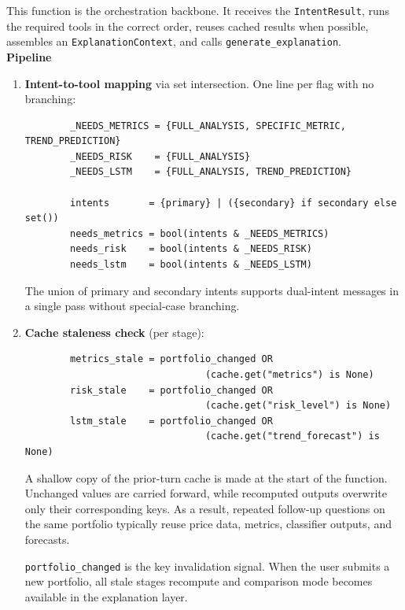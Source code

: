This function is the orchestration backbone. It receives the \texttt{IntentResult}, runs the required tools in the correct order, reuses cached results when possible, assembles an \texttt{ExplanationContext}, and calls \texttt{generate\_explanation}.\\

\textbf{Pipeline}

\begin{enumerate}
    \item \textbf{Intent-to-tool mapping} via set intersection. One line per flag with no branching:

    \begin{lstlisting}
        _NEEDS_METRICS = {FULL_ANALYSIS, SPECIFIC_METRIC, TREND_PREDICTION}
        _NEEDS_RISK    = {FULL_ANALYSIS}
        _NEEDS_LSTM    = {FULL_ANALYSIS, TREND_PREDICTION}

        intents       = {primary} | ({secondary} if secondary else set())
        needs_metrics = bool(intents & _NEEDS_METRICS)
        needs_risk    = bool(intents & _NEEDS_RISK)
        needs_lstm    = bool(intents & _NEEDS_LSTM)
    \end{lstlisting}

    The union of primary and secondary intents supports dual-intent messages in a single pass without special-case branching.

    \item \textbf{Cache staleness check} (per stage):
    \begin{lstlisting}
        metrics_stale = portfolio_changed OR
                                (cache.get("metrics") is None)
        risk_stale    = portfolio_changed OR
                                (cache.get("risk_level") is None)
        lstm_stale    = portfolio_changed OR
                                (cache.get("trend_forecast") is None)
    \end{lstlisting}

    A shallow copy of the prior-turn cache is made at the start of the function. Unchanged values are carried forward, while recomputed outputs overwrite only their corresponding keys. As a result, repeated follow-up questions on the same portfolio typically reuse price data, metrics, classifier outputs, and forecasts.
    
    \texttt{portfolio\_changed} is the key invalidation signal. When the user submits a new portfolio, all stale stages recompute and comparison mode becomes available in the explanation layer.


\end{enumerate}
